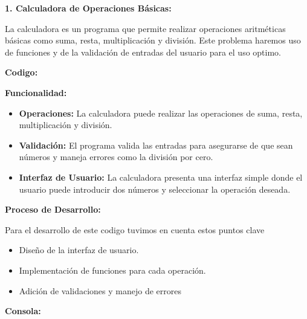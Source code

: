 \documentclass[a4paper]{article}
\newcommand\textstyleListLabelxiv[1]{\textrm{\textbf{#1}}}
\begin{document}
{
\textbf{1. Calculadora de Operaciones Básicas:}}

{
La calculadora es un programa que permite realizar operaciones aritméticas básicas como suma, resta, multiplicación y
división. Este problema haremos uso de funciones y de la validación de entradas del usuario para el uso optimo.}


\bigskip

{
\textbf{Codigo:}}

\begin{center}
\end{center}

\bigskip

{
\textbf{Funcionalidad:}}


\bigskip

\begin{itemize}[resume*=listWWNumii]
\item {
\textbf{Operaciones:} La calculadora puede realizar las operaciones de suma, resta, multiplicación y división.}
\item {
\textbf{Validación:} El programa valida las entradas para asegurarse de que sean números y maneja errores como la
división por cero.}
\item {
\textbf{Interfaz de Usuario:} La calculadora presenta una interfaz simple donde el usuario puede introducir dos números
y seleccionar la operación deseada.}
\end{itemize}
{
\textbf{Proceso de Desarrollo:}}


\bigskip

{
Para el desarrollo de este codigo tuvimos en cuenta estos puntos clave}

\begin{itemize}[series=listWWNumiii,label=\textstyleListLabelxiv{{}-}]
\item {
Diseño de la interfaz de usuario.}
\item {
Implementación de funciones para cada operación.}
\item {
Adición de validaciones y manejo de errores}
\end{itemize}
{
\textbf{Consola:}}
\end{document}
